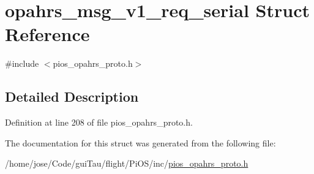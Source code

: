 \hypertarget{structopahrs__msg__v1__req__serial}{\section{opahrs\-\_\-msg\-\_\-v1\-\_\-req\-\_\-serial Struct Reference}
\label{structopahrs__msg__v1__req__serial}
}


{\ttfamily \#include $<$pios\-\_\-opahrs\-\_\-proto.\-h$>$}



\subsection{Detailed Description}


Definition at line 208 of file pios\-\_\-opahrs\-\_\-proto.\-h.



The documentation for this struct was generated from the following file\-:\begin{DoxyCompactItemize}
\item 
/home/jose/\-Code/gui\-Tau/flight/\-Pi\-O\-S/inc/\hyperlink{pios__opahrs__proto_8h}{pios\-\_\-opahrs\-\_\-proto.\-h}\end{DoxyCompactItemize}

